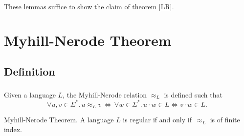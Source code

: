 \documentclass[11pt,a4paper,oneside]{book}
\begin{document}

                        \paragraph{}
                            These lemmas suffice to show the claim of theorem \ref{LR}.
                            

            \paragraph{} 


            

    \chapter{Myhill-Nerode Theorem}

            \section{Definition}


                \paragraph{} Given a language $L$, the Myhill-Nerode relation $\approx_L$ is defined such that 
                \[
                    \forall u, v \in \Sigma^*. \,
                    u \approx_L v \, \Longleftrightarrow \, 
                    \forall w \in \Sigma^*.\, u \cdot w \in L \Leftrightarrow v \cdot w \in L.
                \]


                \begin{theorem}{Myhill-Nerode Theorem.}
                    \label{MN}
                    A language $L$ is regular if and only if $\,\approx_L$ is of finite index.
                \end{theorem}
\end{document}
